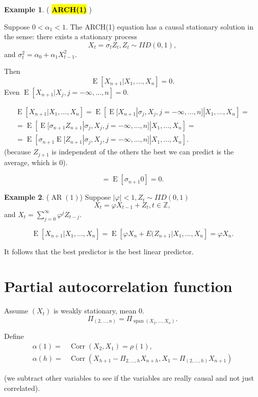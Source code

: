 \documentclass[12pt,a4paper, notitlepage]{book}
\newcommand{\hlc}[2][yellow]{ {\sethlcolor{#1} \hl{#2}} }
\newcommand{\hlcr}[1]{\hlc[lightred]{#1}}
\theoremstyle{definition} %
\newtheorem{example}{Example}[chapter]
\theoremstyle{plain} %
\newcommand{\Z}{\mathbb Z}
\DeclareMathOperator{\E}{E}
\DeclareMathOperator{\Span}{span}
\DeclareMathOperator{\Corr}{Corr}
\DeclareMathOperator{\Ar}{AR}
\newcommand{\New}[1]{ {\bf \hlcr{#1} } }
\begin{document}
\begin{example} (\New{ARCH(1)})

Suppose $0< \alpha_1 < 1$. The ARCH(1) equation has a causal stationary solution in the sense:
there exists a stationary process 
\[ X_t = \sigma_t Z_t, Z_t \sim IID(0,1) , \]
 and $\sigma_t^2 = \alpha_0 + \alpha_1 X_{t-1}^2$. 

Then 
\[ \E[X_{n+1} | X_1, \dots, X_n] = 0. \] 
 Even $ \E[X_{n+1} | X_j, j =-\infty, \dots, n] = 0$.

\begin{align*}
\E[X_{n+1} | X_1, \dots, X_n ] = \E \left[ \E[X_{n+1}|\sigma_j, X_j, j = -\infty, \dots, n] |X_1, \dots, X_n \right] = \\
=  \E\left[\E[\sigma_{n+1} Z_{n+1}|\sigma_j, X_j, j = -\infty, \dots, n] |X_1, \dots, X_n \right] = \\
=  \E\left[ \sigma_{n+1} \E[Z_{n+1}|\sigma_j, X_j, j = -\infty, \dots, n]|X_1, \dots, X_n \right] . 
\end{align*}
 (because $Z_{j+1}$ is independent of the others the best we can predict is the average, which is $0$).

\[ = \E[\sigma_{n+1} 0] = 0. \]
\end{example}

\begin{example} ($\Ar(1)$)
Suppose $|\varphi| < 1, Z_t \sim IID(0,1)$ 
\[  X_t = \varphi X_{t-1} + Z_t, t\in \Z , \]
 and $X_t = \sum_{j = 0}^\infty \varphi^j Z_{t-j}$.

\[ \E[X_{n+1}|X_1, \ldots , X_n] = \E[ \varphi X_n + E(Z_{n+1} | X_1, \ldots, X_n] = \varphi X_n. \]

It follows that the best predictor is the best linear predictor.
\end{example}

\section{ Partial autocorrelation function}

Assume $(X_t)$ is weakly stationary, mean $0$.
\[ \Pi_{(2, \dots, n)} = \Pi_{\Span(X_2, \dots, X_n)} . \]

Define 
\begin{align*} \alpha(1) = & \Corr(X_2, X_1) = \rho(1), \\
 \alpha(h) = & \Corr(X_{h+1} - \Pi_{2, \dots, h} X_{n+h}, X_1 - \Pi_{(2, \dots, h)}X_{n+1}) \end{align*}

(we subtract other variables to see if the variables are really causal and not just correlated).
\end{document}
